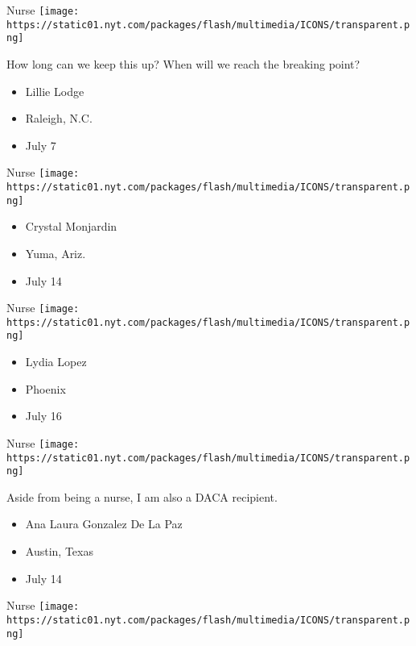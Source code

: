 \protect\hyperlink{item-lillie-lodge}{}

Nurse
\texttt{[image: https://static01.nyt.com/packages/flash/multimedia/ICONS/transparent.png]}

How long can we keep this up? When will we reach the breaking point?

\begin{itemize}
\tightlist
\item
  Lillie Lodge
\item
  Raleigh, N.C.
\item
  July 7
\end{itemize}

\protect\hyperlink{item-crystal-monjardin}{}

Nurse
\texttt{[image: https://static01.nyt.com/packages/flash/multimedia/ICONS/transparent.png]}

\begin{itemize}
\tightlist
\item
  Crystal Monjardin
\item
  Yuma, Ariz.
\item
  July 14
\end{itemize}

\protect\hyperlink{item-lydia-lopez}{}

Nurse
\texttt{[image: https://static01.nyt.com/packages/flash/multimedia/ICONS/transparent.png]}

\begin{itemize}
\tightlist
\item
  Lydia Lopez
\item
  Phoenix
\item
  July 16
\end{itemize}

\protect\hyperlink{item-ana-laura-gonzalez-de-la-paz}{}

Nurse
\texttt{[image: https://static01.nyt.com/packages/flash/multimedia/ICONS/transparent.png]}

Aside from being a nurse, I am also a DACA recipient.

\begin{itemize}
\tightlist
\item
  Ana Laura Gonzalez De La Paz
\item
  Austin, Texas
\item
  July 14
\end{itemize}

\protect\hyperlink{item-tim-ellsberry}{}

Nurse
\texttt{[image: https://static01.nyt.com/packages/flash/multimedia/ICONS/transparent.png]}

